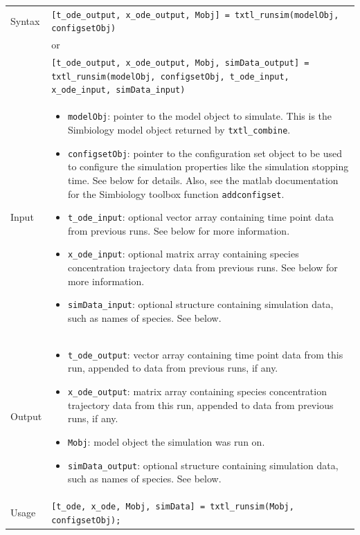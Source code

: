 \documentclass[english]{report}
\begin{document}
		\begin{tabular}{p{2cm}|p{13cm}}
			Syntax & \texttt{[t\_ode\_output, x\_ode\_output, Mobj] = txtl\_runsim(modelObj, configsetObj)}\\
			& or \\
			& \texttt{[t\_ode\_output, x\_ode\_output, Mobj, simData\_output] = txtl\_runsim(modelObj, configsetObj, t\_ode\_input, x\_ode\_input, simData\_input)}\\ \hline
			Input &  \begin{itemize}
				\item \texttt{modelObj}: pointer to the model object to simulate. This is the Simbiology model object returned by \texttt{txtl\_combine}.
				\item \texttt{configsetObj}: pointer to the configuration set object to be used to configure the simulation properties like the simulation stopping time. See below for details. Also, see the matlab documentation for the Simbiology toolbox function \texttt{addconfigset}. 
				\item \texttt{t\_ode\_input}: optional vector array containing time point data from previous runs. See below for more information. 
				\item \texttt{x\_ode\_input}: optional matrix array containing species concentration trajectory data from previous runs. See below for more information.
				\item \texttt{simData\_input}: optional structure containing simulation data, such as names of species. See below.   
				\end{itemize} \\ \hline
			Output & \begin{itemize}
				\item \texttt{t\_ode\_output}: vector array containing time point data from this run, appended to data from previous runs, if any. 
				\item \texttt{x\_ode\_output}: matrix array containing species concentration trajectory data from this run, appended to data from previous runs, if any.
				\item \texttt{Mobj}: model object the simulation was run on. 
				\item \texttt{simData\_output}: optional structure containing simulation data, such as names of species. See below.   
				\end{itemize} \\ \hline
			Usage & \texttt{[t\_ode, x\_ode, Mobj, simData] = txtl\_runsim(Mobj, configsetObj);}\\
			\end{tabular}
			
\end{document}
